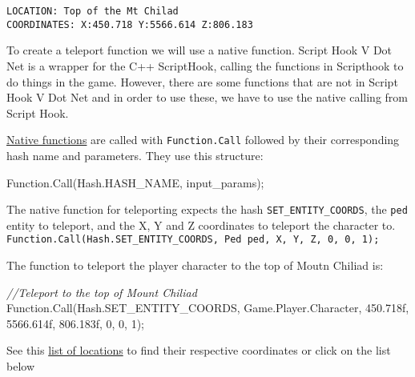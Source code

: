 \documentclass[
  openany]{book}
\newenvironment{Shaded}{\begin{snugshade}}{\end{snugshade}}
\newcommand{\CommentTok}[1]{\textcolor[rgb]{0.56,0.35,0.01}{\textit{#1}}}
\newcommand{\DecValTok}[1]{\textcolor[rgb]{0.00,0.00,0.81}{#1}}
\newcommand{\FloatTok}[1]{\textcolor[rgb]{0.00,0.00,0.81}{#1}}
\newcommand{\FunctionTok}[1]{\textcolor[rgb]{0.00,0.00,0.00}{#1}}
\newcommand{\NormalTok}[1]{#1}
\begin{document}
\begin{verbatim}
LOCATION: Top of the Mt Chilad
COORDINATES: X:450.718 Y:5566.614 Z:806.183
\end{verbatim}

To create a teleport function we will use a native function. Script Hook V Dot Net is a wrapper for the C++ ScriptHook, calling the functions in Scripthook to do things in the game. However, there are some functions that are not in Script Hook V Dot Net and in order to use these, we have to use the native calling from Script Hook.

\href{https://nitanmarcel.github.io/shvdn-docs.github.io/namespace_g_t_a_1_1_native.html\#a84977424e1cb7b6f1c2902770bf9ad2d}{Native functions} are called with \texttt{Function.Call} followed by their corresponding hash name and parameters. They use this structure:

\begin{Shaded}
\begin{Highlighting}[]
\NormalTok{Function.}\FunctionTok{Call}\NormalTok{(Hash.}\FunctionTok{HASH_NAME}\NormalTok{, input_params);}
\end{Highlighting}
\end{Shaded}

The native function for teleporting expects the hash \texttt{SET\_ENTITY\_COORDS}, the \texttt{ped} entity to teleport, and the X, Y and Z coordinates to teleport the character to. \texttt{Function.Call(Hash.SET\_ENTITY\_COORDS,\ Ped\ ped,\ X,\ Y,\ Z,\ 0,\ 0,\ 1);}

The function to teleport the player character to the top of Moutn Chiliad is:

\begin{Shaded}
\begin{Highlighting}[]
\CommentTok{//Teleport to the top of Mount Chiliad}
\NormalTok{Function.}\FunctionTok{Call}\NormalTok{(Hash.}\FunctionTok{SET_ENTITY_COORDS}\NormalTok{, Game.}\FunctionTok{Player}\NormalTok{.}\FunctionTok{Character}\NormalTok{, }\FloatTok{450.718f}\NormalTok{, }\FloatTok{5566.614f}\NormalTok{, }\FloatTok{806.183f}\NormalTok{, }\DecValTok{0}\NormalTok{, }\DecValTok{0}\NormalTok{, }\DecValTok{1}\NormalTok{);}
\end{Highlighting}
\end{Shaded}

See this \href{https://gtaforums.com/topic/792877-list-of-over-100-coordinates-more-comming/}{list of locations} to find their respective coordinates or click on the list below
\end{document}
